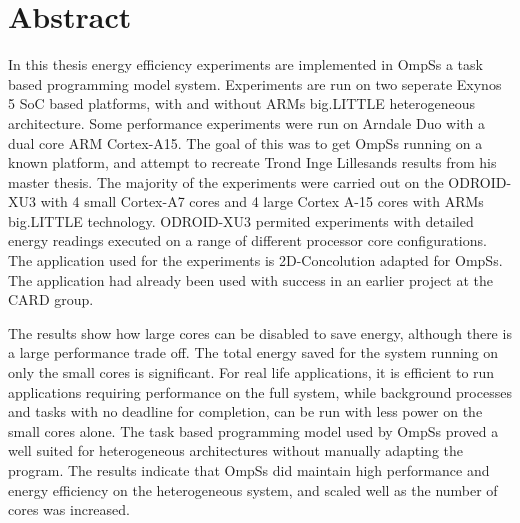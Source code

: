 \section*{Abstract}
In this thesis energy efficiency experiments are implemented in OmpSs a task based programming model system.
Experiments are run on two seperate Exynos 5 SoC based platforms, with and without ARMs big.LITTLE heterogeneous architecture.
Some performance experiments were run on Arndale Duo with a dual core ARM Cortex-A15.
The goal of this was to get OmpSs running on a known platform, and attempt to recreate Trond Inge Lillesands results from his master thesis.
The majority of the experiments were carried out on the ODROID-XU3 with 4 small Cortex-A7 cores and 4 large Cortex A-15 cores with ARMs big.LITTLE technology.
ODROID-XU3 permited experiments with detailed energy readings executed on a range of different processor core configurations.
The application used for the experiments is 2D-Concolution adapted for OmpSs.
The application had already been used with success in an earlier project at the CARD group.

The results show how large cores can be disabled to save energy, although there is a large performance trade off.
The total energy saved for the system running on only the small cores is significant.
For real life applications, it is efficient to run applications requiring performance on the full system, while background processes and tasks with no deadline for completion, can be run with less power on the small cores alone.
The task based programming model used by OmpSs proved a well suited for heterogeneous architectures without manually adapting the program.
The results indicate that OmpSs did maintain high performance and energy efficiency on the heterogeneous system, and scaled well as the number of cores was increased.
